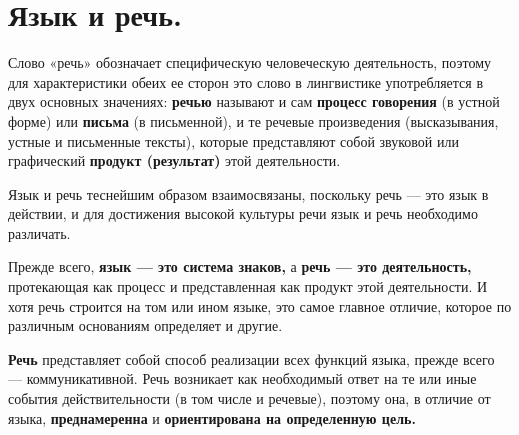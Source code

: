 \section{Язык и речь.}

Слово «речь» обозначает специфическую человеческую деятельность, поэтому для характеристики обеих ее сторон это слово в лингвистике употребляется в двух основных значениях: \textbf{речью} называют и сам \textbf{процесс говорения} (в устной форме) или \textbf{письма} (в письменной), и те речевые произведения (высказывания, устные и письменные тексты), которые представляют собой звуковой или графический \textbf{продукт (результат)} этой деятельности.

Язык и речь теснейшим образом взаимосвязаны, поскольку речь --- это язык в действии, и для достижения высокой культуры речи язык и речь необходимо различать.

Прежде всего, \textbf{язык --- это система знаков,} а \textbf{речь --- это деятельность,} протекающая как процесс и представленная как продукт этой деятельности.
И хотя речь строится на том или ином языке, это самое главное отличие, которое по различным основаниям определяет и другие.

\textbf{Речь} представляет собой способ реализации всех функций языка, прежде всего — коммуникативной.
Речь возникает как необходимый ответ на те или иные события действительности (в том числе и речевые), поэтому она, в отличие от языка, \textbf{преднамеренна} и \textbf{ориентирована на определенную цель.}

